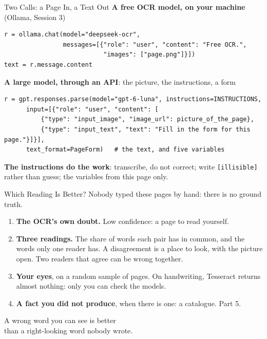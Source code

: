 \documentclass[svgnames,x11names,dvipsnames]{beamer}
\newcommand{\new}[1]{#1}
\begin{document}
\begin{frame}[fragile]{\new{Two Calls: a Page In, a Text Out}}
\vspace{0.1cm}
\small
\textbf{A free OCR model, on your machine} (Ollama, Session 3)
{\scriptsize
\begin{verbatim}
r = ollama.chat(model="deepseek-ocr",
                messages=[{"role": "user", "content": "Free OCR.",
                           "images": ["page.png"]}])
text = r.message.content
\end{verbatim}}

\textbf{A large model, through an API}: the picture, the instructions, a form
{\scriptsize
\begin{verbatim}
r = gpt.responses.parse(model="gpt-6-luna", instructions=INSTRUCTIONS,
      input=[{"role": "user", "content": [
          {"type": "input_image", "image_url": picture_of_the_page},
          {"type": "input_text", "text": "Fill in the form for this page."}]}],
      text_format=PageForm)   # the text, and five variables
\end{verbatim}}

\small
\textbf{The instructions do the work}: transcribe, do not correct; write \texttt{[illisible]} rather than guess; the variables from this page only.
\end{frame}

\begin{frame}{\new{Which Reading Is Better?}}
\small
Nobody typed these pages by hand: there is no ground truth.

\vspace{0.3cm}
\begin{enumerate}
    \setlength{\itemsep}{7pt}
    \item \textbf{The OCR's own doubt.} Low confidence: a page to read yourself.
    \item \textbf{\new{Three readings.}} The share of words each pair has in common, and the words only one reader has. A disagreement is a place to look, with the picture open. Two readers that agree can be wrong together.
    \item \textbf{Your eyes}, on a random sample of pages. On handwriting, Tesseract returns almost nothing: only you can check the models.
    \item \textbf{A fact you did not produce}, when there is one: a catalogue. Part 5.
\end{enumerate}

\vspace{0.4cm}
\centering
\alert{A wrong word you can see is better\\ than a right-looking word nobody wrote.}
\end{frame}
\end{document}
